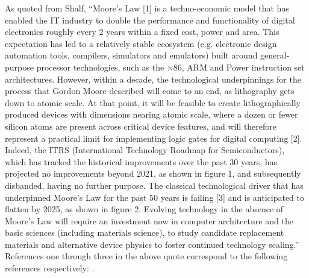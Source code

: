 \documentclass[]{article}
\begin{document}
\begin{comment}

Pre-submission
Unless you have been approached directly by the Editor-in-Chief of a journal or another member of its editorial or publishing team, you will need to submit a proposal to guest edit a special issue to the relevant editorial office. If you are contemplating a special issue proposal, you might find the following recommendations helpful.

Preparing a proposal for a special issue
Working together with any other guest editors, you should prepare a proposal that, in addition to observing any special guidelines which are imposed by the journal's guide for authors or special issue guide (if any):

Sets out the importance of the area on which the special issue will focus;

\end{comment}

As quoted from Shalf\cite{shalf2020future},
``Moore’s Law [1] is a techno-economic model that has enabled the IT industry to double the performance and functionality of digital electronics roughly every 2 years within a fixed cost, power and area. This expectation has led to a relatively stable ecosystem (e.g. electronic design automation tools, compilers, simulators and emulators) built around general-purpose processor technologies, such as the ×86, ARM and Power instruction set architectures. However, within a decade, the technological underpinnings for the process that Gordon Moore described will come to an end, as lithography gets down to atomic scale. At that point, it will be feasible to create lithographically produced devices with dimensions nearing atomic scale, where a dozen or fewer silicon atoms are present across critical device features, and will therefore represent a practical limit for implementing logic gates for digital computing [2]. Indeed, the ITRS (International Technology Roadmap for Semiconductors), which has tracked the historical improvements over the past 30 years, has projected no improvements beyond 2021, as shown in figure 1, and subsequently disbanded, having no further purpose. The classical technological driver that has underpinned Moore’s Law for the past 50 years is failing [3] and is anticipated to flatten by 2025, as shown in figure 2. Evolving technology in the absence of Moore’s Law will require an investment now in computer architecture and the basic sciences (including materials science), to study candidate replacement materials and alternative device physics to foster continued technology scaling.'' References one through three in the above quote 
correspond to the following references respectively: 
\cite{moore2021cramming}\cite{mack2015multiple}\cite{markov2014limits}.
\end{document}
